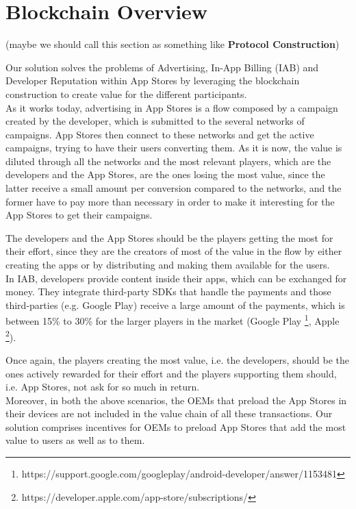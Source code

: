 \section{Blockchain Overview}
(maybe we should call this section as something like \textbf{Protocol Construction})\\

\vfill
\vfill


Our solution solves the problems of Advertising, In-App Billing (IAB) and Developer Reputation within App Stores by leveraging the blockchain construction to create value for the different participants.\\

As it works today, advertising in App Stores is a flow composed by a campaign created by the developer, which is submitted to the several networks of campaigns. App Stores then connect to these networks and get the active campaigns, trying to have their users converting them. As it is now, the value is diluted through all the networks and the most relevant players, which are the developers and the App Stores, are the ones losing the most value, since the latter receive a small amount per conversion compared to the networks, and the former have to pay more than necessary in order to make it interesting for the App Stores to get their campaigns.

The developers and the App Stores should be the players getting the most for their effort, since they are the creators of most of the value in the flow by either creating the apps or by distributing and making them available for the users.\\

In IAB, developers provide content inside their apps, which can be exchanged for money. They integrate third-party SDKs that handle the payments and those third-parties (e.g. Google Play) receive a large amount of the payments, which is between 15\% to 30\% for the larger players in the market (Google Play \footnote{https://support.google.com/googleplay/android-developer/answer/1153481}, Apple \footnote{https://developer.apple.com/app-store/subscriptions/}).

Once again, the players creating the most value, i.e. the developers, should be the ones actively rewarded for their effort and the players supporting them should, i.e. App Stores, not ask for so much in return.\\

Moreover, in both the above scenarios, the OEMs that preload the App Stores in their devices are not included in the value chain of all these transactions. Our solution comprises incentives for OEMs to preload App Stores that add the most value to users as well as to them.\\

